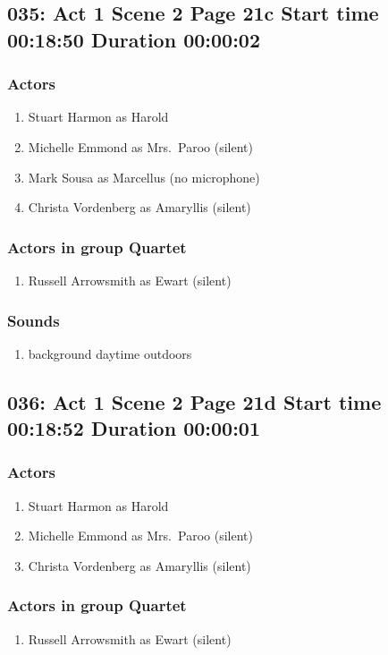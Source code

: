 \subsection{035: Act 1 Scene 2 Page 21c Start time 00:18:50 Duration 00:00:02}

\subsubsection{Actors}
\begin{enumerate}
\item Stuart Harmon as Harold
\item Michelle Emmond as Mrs.~Paroo (silent)
\item Mark Sousa as Marcellus (no microphone)
\item Christa Vordenberg as Amaryllis (silent)
\end{enumerate}
\subsubsection{Actors in group Quartet}
\begin{enumerate}
\item Russell Arrowsmith as Ewart (silent)
\end{enumerate}

\subsubsection{Sounds}
\begin{enumerate}
\item background daytime outdoors
\end{enumerate}
\subsection{036: Act 1 Scene 2 Page 21d Start time 00:18:52 Duration 00:00:01}

\subsubsection{Actors}
\begin{enumerate}
\item Stuart Harmon as Harold
\item Michelle Emmond as Mrs.~Paroo (silent)
\item Christa Vordenberg as Amaryllis (silent)
\end{enumerate}
\subsubsection{Actors in group Quartet}
\begin{enumerate}
\item Russell Arrowsmith as Ewart (silent)
\end{enumerate}

